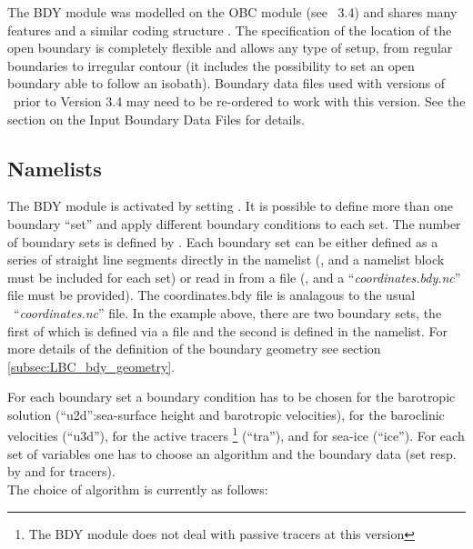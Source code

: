 \documentclass[../main/NEMO_manual]{subfiles}
\begin{document}
The BDY module was modelled on the OBC module (see \NEMO\ 3.4) and shares many features and
a similar coding structure \citep{chanut_trpt05}.
The specification of the location of the open boundary is completely flexible and
allows any type of setup, from regular boundaries to irregular contour (it includes the possibility to set an open boundary able to follow an isobath).
Boundary data files used with versions of \NEMO\ prior to Version 3.4 may need to be re-ordered to work with this version.
See the section on the Input Boundary Data Files for details.

\subsection{Namelists}
\label{subsec:LBC_bdy_namelist}

The BDY module is activated by setting  .
It is possible to define more than one boundary ``set'' and apply different boundary conditions to each set.
The number of boundary sets is defined by .
Each boundary set can be either defined as a series of straight line segments directly in the namelist
(, and a namelist block  must be included for each set) or read in from a file (, and a ``\textit{coordinates.bdy.nc}'' file must be provided).
The coordinates.bdy file is analagous to the usual \NEMO\ ``\textit{coordinates.nc}'' file.
In the example above, there are two boundary sets, the first of which is defined via a file and
the second is defined in the namelist.
For more details of the definition of the boundary geometry see section \autoref{subsec:LBC_bdy_geometry}.

For each boundary set a boundary condition has to be chosen for the barotropic solution
(``u2d'':sea-surface height and barotropic velocities), for the baroclinic velocities (``u3d''),
for the active tracers \footnote{The BDY module does not deal with passive tracers at this version} (``tra''), and for sea-ice (``ice'').
For each set of variables one has to choose an algorithm and the boundary data (set resp. by  and  for tracers).\\

The choice of algorithm is currently as follows:
\end{document}

